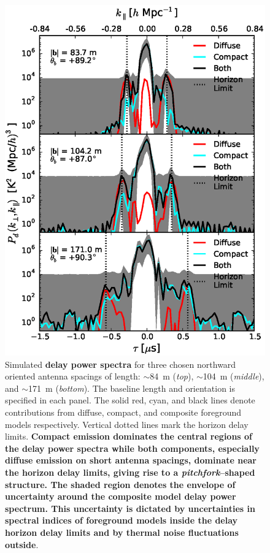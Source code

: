 \documentclass[preprint2,iop,numberedappendix]{emulateapj}
\begin{document}
\begin{figure}[htb]
\centering
\includegraphics[width=\linewidth]{figure9.eps}
\caption{Simulated {\bf delay power spectra} for three chosen northward oriented antenna spacings of length: $\sim$84~m ({\it top}), $\sim$104~m ({\it middle}), and $\sim$171~m ({\it bottom}). The baseline length and orientation is specified in each panel. The solid red, cyan, and black lines denote contributions from diffuse, compact, and composite foreground models respectively. Vertical dotted lines mark the horizon delay limits. {\bf Compact emission dominates the central regions of the delay power spectra while both components, especially diffuse emission on short antenna spacings, dominate near the horizon delay limits, giving rise to a {\it pitchfork}--shaped structure. The shaded region denotes the envelope of uncertainty around the composite model delay power spectrum. This uncertainty is dictated by uncertainties in spectral indices of foreground models inside the delay horizon delay limits and by thermal noise fluctuations outside}. \label{fig:pitchfork-baselines}}
\end{figure}
\end{document}
